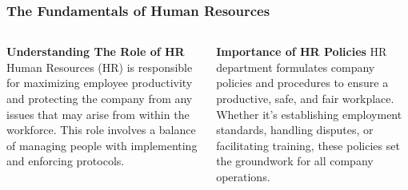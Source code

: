 \documentclass[5pt]{beamer}
\begin{document}
\begin{frame}
\frametitle{The Fundamentals of Human Resources}
\begin{columns}
\begin{column}{0.45\textwidth}
\begin{block}{\textbf{Understanding The Role of HR}}
Human Resources (HR) is responsible for maximizing employee productivity and protecting the company from any issues that may arise from within the workforce. This role involves a balance of managing people with implementing and enforcing protocols.
\end{block}
\end{column}
\begin{column}{0.45\textwidth}
\begin{block}{\textbf{Importance of HR Policies}}
HR department formulates company policies and procedures to ensure a productive, safe, and fair workplace. Whether it's establishing employment standards, handling disputes, or facilitating training, these policies set the groundwork for all company operations.
\end{block}
\end{column}
\end{columns}
\end{frame}
\end{document}

